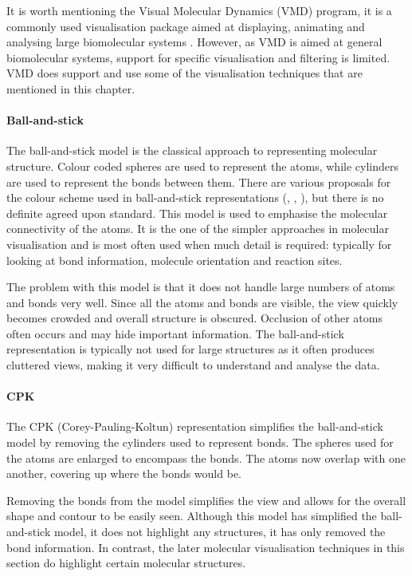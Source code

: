 It is worth mentioning the Visual Molecular Dynamics (VMD) \citep{humphrey96}
program, it is a commonly used visualisation package aimed at displaying,
animating and analysing large biomolecular systems \citep{VMD}. However, as VMD
is aimed at general biomolecular systems, support for specific visualisation
and filtering is limited. VMD does support and use some of the visualisation
techniques that are mentioned in this chapter.


\paragraph{Ball-and-stick}

The ball-and-stick model is the classical approach to representing molecular
structure. Colour coded spheres are used to represent the atoms, while
cylinders are used to represent the bonds between them. There are various
proposals for the colour scheme used in ball-and-stick representations
(\citep{rasmolcolour}, \citep{jmolcolour}, \citep{drumscolour}), but there is
no definite agreed upon standard. This model is used to emphasise the molecular
connectivity of the atoms. It is the one of the simpler approaches in molecular
visualisation and is most often used when much detail is required: typically
for looking at bond information, molecule orientation and reaction sites.

The problem with this model is that it does not handle large numbers of atoms
and bonds very well. Since all the atoms and bonds are visible, the view
quickly becomes crowded and overall structure is obscured. Occlusion of other
atoms often occurs and may hide important information. The ball-and-stick
representation is typically not used for large structures as it often produces
cluttered views, making it very difficult to understand and analyse the data.


\paragraph{CPK}

The CPK (Corey-Pauling-Koltun) \citep{corey53} representation simplifies the
ball-and-stick model by removing the cylinders used to represent bonds. The
spheres used for the atoms are enlarged to encompass the bonds. The atoms now
overlap with one another, covering up where the bonds would be.

Removing the bonds from the model simplifies the view and allows for the
overall shape and contour to be easily seen. Although this model has simplified
the ball-and-stick model, it does not highlight any structures, it has only
removed the bond information. In contrast, the later molecular visualisation
techniques in this section do highlight certain molecular structures.

